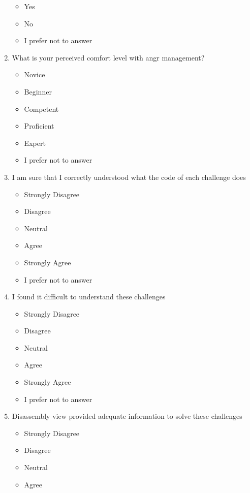 \begin{enumerate}
    \begin{itemize}
        \item Yes
        \item No
        \item I prefer not to answer
    \end{itemize}
    \item What is your perceived comfort level with angr management?
    \begin{itemize}
        \item Novice
        \item Beginner
        \item Competent
        \item Proficient
        \item Expert
        \item I prefer not to answer
    \end{itemize}
    \item I am sure that I correctly understood what the code of each challenge does
    \begin{itemize}
        \item Strongly Disagree
        \item Disagree
        \item Neutral
        \item Agree
        \item Strongly Agree
        \item I prefer not to answer
    \end{itemize}
    \item I found it difficult to understand these challenges
    \begin{itemize}
        \item Strongly Disagree
        \item Disagree
        \item Neutral
        \item Agree
        \item Strongly Agree
        \item I prefer not to answer
    \end{itemize}
    \item Disassembly view provided adequate information to solve these challenges
    \begin{itemize}
        \item Strongly Disagree
        \item Disagree
        \item Neutral
        \item Agree

\end{itemize}
\end{enumerate}
